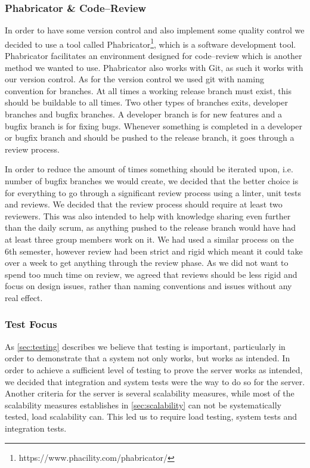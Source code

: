 \subsubsection{Phabricator \& Code--Review}
In order to have some version control and also implement some quality control we decided to use a tool called Phabricator\footnote{https://www.phacility.com/phabricator/}, which is a software development tool.
Phabricator facilitates an environment designed for code--review which is another method we wanted to use.
Phabricator also works with Git, as such it works with our version control.
As for the version control we used git with naming convention for branches.
At all times a working release branch must exist, this should be buildable to all times.
Two other types of branches exits, developer branches and bugfix branches.
A developer branch is for new features and a bugfix branch is for fixing bugs.
Whenever something is completed in a developer or bugfix branch and should be pushed to the release branch, it goes through a review process.

In order to reduce the amount of times something should be iterated upon, i.e. number of bugfix branches we would create, we decided that the better choice is for everything to go through a significant review process using a linter, unit tests and reviews.
We decided that the review process should require at least two reviewers.
This was also intended to help with knowledge sharing even further than the daily scrum, as anything pushed to the release branch would have had at least three group members work on it.
We had used a similar process on the 6th semester, however review had been strict and rigid which meant it could take over a week to get anything through the review phase.
As we did not want to spend too much time on review, we agreed that reviews should be less rigid and focus on design issues, rather than naming conventions and issues without any real effect.
\subsubsection{Test Focus}
As \cref{sec:testing} describes we believe that testing is important, particularly in order to demonstrate that a system not only works, but works as intended.
In order to achieve a sufficient level of testing to prove the server works as intended, we decided that integration and system tests were the way to do so for the server.
Another criteria for the server is several scalability measures, while most of the scalability measures establishes in \cref{sec:scalability} can not be systematically tested, load scalability can.
This led us to require load testing, system tests and integration tests.
